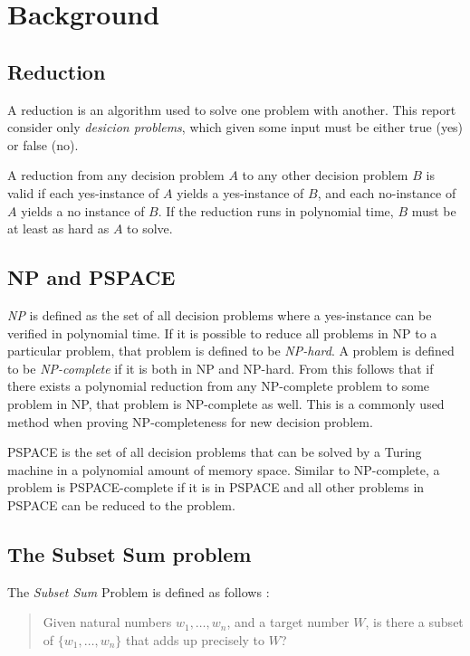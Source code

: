 \section{Background}
\label{sec:background}

\subsection{Reduction}
A reduction is an algorithm used to solve one problem with another. This report consider only \textit{desicion problems}, which given some input must be either true (yes) or false (no).

A reduction from any decision problem $A$ to any other decision problem $B$ is valid if each yes-instance of $A$ yields a yes-instance of $B$, and each no-instance of $A$ yields a no instance of $B$. If the reduction runs in polynomial time, $B$ must be at least as hard as $A$ to solve.\cite{reduction}

\subsection{NP and PSPACE}
\textit{NP} is defined as the set of all decision problems where a yes-instance can be verified in polynomial time. If it is possible to reduce all problems in NP to a particular problem, that problem is defined to be \textit{NP-hard}. A problem is defined to be \textit{NP-complete} if it is both in NP and NP-hard. From this follows that if there exists a polynomial reduction from any NP-complete problem to some problem in NP, that problem is NP-complete as well. This is a commonly used method when proving NP-completeness for new decision problem.

PSPACE is the set of all decision problems that can be solved by a Turing machine in a polynomial amount of memory space. Similar to NP-complete, a problem is PSPACE-complete if it is in PSPACE and all other problems in PSPACE can be reduced to the problem.

\subsection{The Subset Sum problem}

The \textit{Subset Sum} Problem is defined as follows \cite[p.~491]{algorithm}:

\begin{quote}
Given natural numbers $w_1, \ldots, w_n$, and a target number $W$, is there a subset of $\{w_1, \ldots, w_n \}$ that adds up precisely to $W$?
\end{quote}

